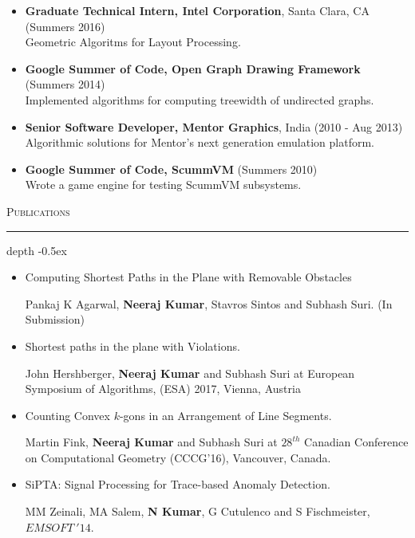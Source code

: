 \documentclass[11pt]{article}
\def\Vhrulefill{\leavevmode\leaders\hrule height 1.2ex depth \dimexpr2pt-0.5ex\hfill\kern0pt}
\begin{document}
{\begin{itemize}
	\item \textbf{Graduate Technical Intern, Intel Corporation}, Santa Clara, CA \hfill(Summers 2016) \\
        Geometric Algoritms for Layout Processing.
	
    \item \textbf{Google Summer of Code, Open Graph Drawing Framework} \hfill(Summers 2014) \\
		Implemented algorithms for computing treewidth of undirected graphs.

	\item \textbf{Senior Software Developer, Mentor Graphics}, India \hfill(2010 - Aug 2013) \\
		Algorithmic solutions for Mentor's next generation emulation platform.
	
	\item \textbf{Google Summer of Code, ScummVM} \hfill(Summers 2010) \\
		Wrote a game engine for testing ScummVM subsystems.
\end{itemize}

\medskip
\noindent\textsc{Publications}
\textcolor{mygray}{\noindent\Vhrulefill}
\begin{itemize}
    \item Computing Shortest Paths in the Plane with Removable Obstacles
        
        Pankaj K Agarwal, \textbf{Neeraj Kumar}, Stavros Sintos and Subhash Suri.
        (In Submission)
    
    \item Shortest paths in the plane with Violations.

        John Hershberger, \textbf{Neeraj Kumar} and Subhash Suri at
        European Symposium of Algorithms, (ESA) 2017, Vienna, Austria


    \item Counting Convex $k$-gons in an Arrangement of Line Segments. 
    
        Martin Fink, \textbf{Neeraj Kumar} and Subhash Suri at
        $28^{th}$ Canadian Conference on Computational Geometry (CCCG'16), Vancouver, Canada.

    \item SiPTA: Signal Processing for Trace-based Anomaly Detection.

        MM Zeinali, MA Salem, \textbf{N Kumar}, G Cutulenco and S Fischmeister, $EMSOFT~'14$.
\end{itemize}

}
\end{document}
